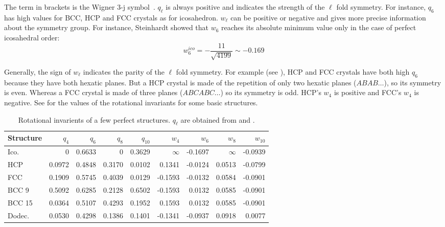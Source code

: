 The term in brackets is the Wigner 3-j symbol~\citep{Landau1965}. $q_\ell$ is always positive and indicates the strength of the $\ell$ fold symmetry. For instance, $q_6$ has high values for \ac{BCC}, \ac{HCP} and \ac{FCC} crystals as for icosahedron. $w_\ell$ can be positive or negative and gives more precise information about the symmetry group. For instance, Steinhardt  showed that $w_6$ reaches its absolute minimum value only in the case of perfect icosahedral order:
\begin{equation}
w_6^{ico}= -\frac{11}{\sqrt{4199}} \sim -0.169
\label{eq:w6ico}
\end{equation}

Generally, the sign of $w_\ell$ indicates the parity of the $\ell$ fold symmetry. For example (see ), \ac{HCP} and \ac{FCC} crystals have both high $q_6$ because they have both hexatic planes. But a \ac{HCP} crystal is made of the repetition of only two hexatic planes ($ABAB\ldots$), so its symmetry is even. Whereas a \ac{FCC} crystal is made of three planes ($ABCABC\ldots$) so its symmetry is odd. \ac{HCP}'s $w_4$ is positive and \ac{FCC}'s $w_4$ is negative. See  for the values of the rotational invariants for some basic structures.

\begin{table}
	\begin{center}
	\begin{tabular}{|l|r|r|r|r|r|r|r|r|}
		\hline
		Structure & $q_4$ & $q_6$ & $q_8$ & $q_{10}$ & $w_4$ & $w_6$ & $w_8$ & $w_{10}$ \\ \hline
		Ico. & 0 & 0.6633 & 0 & 0.3629 & $\infty$ & -0.1697 & $\infty$ & -0.0939 \\ \hline
		\ac{HCP} & 0.0972 & 0.4848 & 0.3170 & 0.0102 & 0.1341 & -0.0124 & 0.0513 & -0.0799 \\ \hline
		\ac{FCC} & 0.1909 & 0.5745 & 0.4039 & 0.0129 & -0.1593 & -0.0132 & 0.0584 & -0.0901 \\ \hline
		\ac{BCC} 9 & 0.5092 & 0.6285 & 0.2128 & 0.6502 & -0.1593 & 0.0132 & 0.0585 & -0.0901 \\ \hline
		\ac{BCC} 15 & 0.0364 & 0.5107 & 0.4293 & 0.1952 & 0.1593 & 0.0132 & 0.0585 & -0.0901 \\ \hline
		Dodec. & 0.0530 & 0.4298 & 0.1386 & 0.1401 & -0.1341 & -0.0937 & 0.0918 & 0.0077 \\ \hline
	\end{tabular}
	\end{center}
	\caption{Rotational invarients of a few perfect structures. $q_{\ell}$ are obtained from  and .}
	\label{tab:rotational_invarients}
\end{table}

